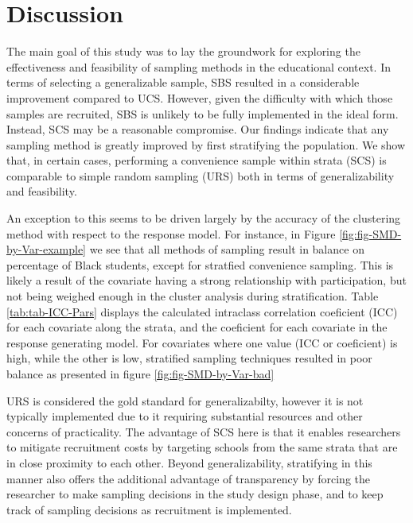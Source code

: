 \documentclass[man,floatsintext]{apa6}
\begin{document}
\newpage

\hypertarget{discussion}{%
\section{Discussion}\label{discussion}}

The main goal of this study was to lay the groundwork for exploring the effectiveness and feasibility of sampling methods in the educational context. In terms of selecting a generalizable sample, SBS resulted in a considerable improvement compared to UCS. However, given the difficulty with which those samples are recruited, SBS is unlikely to be fully implemented in the ideal form. Instead, SCS may be a reasonable compromise. Our findings indicate that any sampling method is greatly improved by first stratifying the population. We show that, in certain cases, performing a convenience sample within strata (SCS) is comparable to simple random sampling (URS) both in terms of generalizability and feasibility.

An exception to this seems to be driven largely by the accuracy of the clustering method with respect to the response model. For instance, in Figure \ref{fig:fig-SMD-by-Var-example} we see that all methods of sampling result in balance on percentage of Black students, except for stratfied convenience sampling. This is likely a result of the covariate having a strong relationship with participation, but not being weighed enough in the cluster analysis during stratification. Table \ref{tab:tab-ICC-Pars} displays the calculated intraclass correlation coeficient (ICC) for each covariate along the strata, and the coeficient for each covariate in the response generating model. For covariates where one value (ICC or coeficient) is high, while the other is low, stratified sampling techniques resulted in poor balance as presented in figure \ref{fig:fig-SMD-by-Var-bad}

URS is considered the gold standard for generalizabilty, however it is not typically implemented due to it requiring substantial resources and other concerns of practicality. The advantage of SCS here is that it enables researchers to mitigate recruitment costs by targeting schools from the same strata that are in close proximity to each other. Beyond generalizability, stratifying in this manner also offers the additional advantage of transparency by forcing the researcher to make sampling decisions in the study design phase, and to keep track of sampling decisions as recruitment is implemented.
\end{document}
